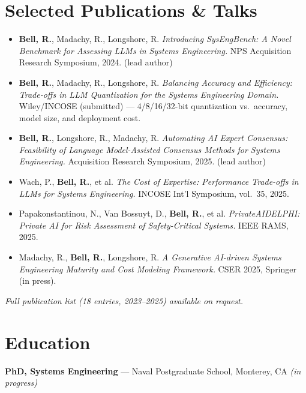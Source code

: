 \documentclass[10pt,letterpaper]{article}
\begin{document}
\section{Selected Publications \& Talks}
\begin{itemize}
  \item \textbf{Bell, R.}, Madachy, R., Longshore, R. \textit{Introducing SysEngBench: A Novel
        Benchmark for Assessing LLMs in Systems Engineering.} NPS Acquisition Research Symposium,
        2024. (lead author)
  \item \textbf{Bell, R.}, Madachy, R., Longshore, R. \textit{Balancing Accuracy and Efficiency:
        Trade-offs in LLM Quantization for the Systems Engineering Domain.} Wiley/INCOSE
        (submitted) --- 4/8/16/32-bit quantization vs.\ accuracy, model size, and deployment cost.
  \item \textbf{Bell, R.}, Longshore, R., Madachy, R. \textit{Automating AI Expert Consensus:
        Feasibility of Language Model-Assisted Consensus Methods for Systems Engineering.}
        Acquisition Research Symposium, 2025. (lead author)
  \item Wach, P., \textbf{Bell, R.}, et al. \textit{The Cost of Expertise: Performance Trade-offs
        in LLMs for Systems Engineering.} INCOSE Int'l Symposium, vol.~35, 2025.
  \item Papakonstantinou, N., Van Bossuyt, D., \textbf{Bell, R.}, et al. \textit{PrivateAIDELPHI:
        Private AI for Risk Assessment of Safety-Critical Systems.} IEEE RAMS, 2025.
  \item Madachy, R., \textbf{Bell, R.}, Longshore, R. \textit{A Generative AI-driven Systems
        Engineering Maturity and Cost Modeling Framework.} CSER 2025, Springer (in press).
\end{itemize}
\textit{\small Full publication list (18 entries, 2023--2025) available on request.}

\section{Education}
\textbf{PhD, Systems Engineering} --- Naval Postgraduate School, Monterey, CA \textit{(in progress)}
\end{document}
